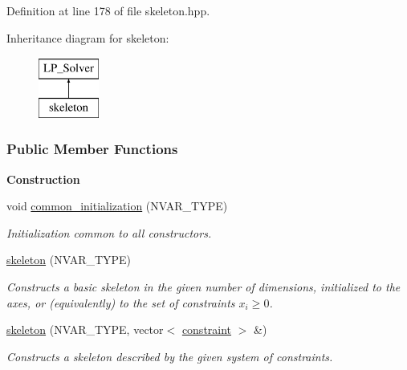 Definition at line 178 of file skeleton.\+hpp.

Inheritance diagram for skeleton\+:\begin{figure}[H]
\begin{center}
\leavevmode
\includegraphics[height=2.000000cm]{group___c_l_s_solvers}
\end{center}
\end{figure}
\subsubsection*{Public Member Functions}
\begin{Indent}\textbf{ Construction}\par
\begin{DoxyCompactItemize}
\item 
\mbox{\label{group___c_l_s_solvers_a7a9181253fc3b9f7b61871047b2b31cc}} 
void \hyperlink{group___c_l_s_solvers_a7a9181253fc3b9f7b61871047b2b31cc}{common\+\_\+initialization} (N\+V\+A\+R\+\_\+\+T\+Y\+PE)
\begin{DoxyCompactList}\small\item\em Initialization common to all constructors. \end{DoxyCompactList}\item 
\hyperlink{group___c_l_s_solvers_a60f5818e984abe589ea8298d189cd9c6}{skeleton} (N\+V\+A\+R\+\_\+\+T\+Y\+PE)
\begin{DoxyCompactList}\small\item\em Constructs a basic skeleton in the given number of dimensions, initialized to the axes, or (equivalently) to the set of constraints $ x_i \geq 0 $. \end{DoxyCompactList}\item 
\hyperlink{group___c_l_s_solvers_a5d0ebc69ae4ff20afd3096e36b31ab1f}{skeleton} (N\+V\+A\+R\+\_\+\+T\+Y\+PE, vector$<$ \hyperlink{group___c_l_s_solvers_classconstraint}{constraint} $>$ \&)
\begin{DoxyCompactList}\small\item\em Constructs a skeleton described by the given system of constraints. \end{DoxyCompactList}\item 

\end{DoxyCompactItemize}
\end{Indent}
